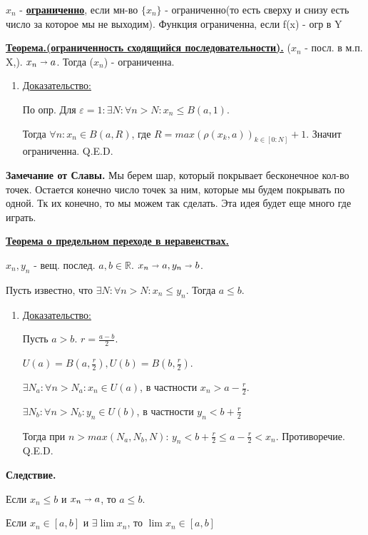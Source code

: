 \documentclass{article}
\newcommand{\deff}[1]{\underline{\textbf{#1}}}
\newcommand{\thmm}[1]{\underline{\textbf{#1}}}
\begin{document}
$x_n$ - \deff{ограниченно}, если мн-во $\{x_n\}$ - ограниченно(то есть сверху и снизу есть число за которое мы не выходим). Функция ограниченна, если f(x) - огр в Y

\thmm{Теорема.(ограниченность сходящийся последовательности).} ($x_n$ - посл. в м.п. X,). $x_n \shortrightarrow a$. Тогда ($x_n$) - ограниченна.



\begin{enumerate}
    \item[] \uline{Доказательство:}
    
    По опр. Для $\varepsilon = 1: \exists N: \forall n> N: x_n \leq B(a,1)$.

    Тогда $\forall n: x_n \in B(a,R)$, где $R=max(\rho(x_k,a))_{k \in [0:N]} +1 $. Значит ограниченна. Q.E.D.
    
\end{enumerate}

\textbf{Замечание от Славы.} Мы берем шар, который покрывает бесконечное кол-во точек. Остается конечно число точек за ним, которые мы будем покрывать по одной. Тк их конечно, то мы можем так сделать. Эта идея будет еще много где играть.

\thmm{Теорема о предельном переходе в неравенствах.}

$x_n,y_n$ - вещ. послед. $a,b \in \mathbb{R}$. $x_n \shortrightarrow a, y_n \shortrightarrow b$.

Пусть известно, что $\exists N:\forall n>N:x_n \leq y_n$. Тогда $a \leq b$.

\begin{enumerate}
    \item[] \uline{Доказательство:}

    Пусть $a>b$. $r = \frac{a-b}{2}$.

    $U(a) = B(a,\frac{r}{2}), U(b) = B(b,\frac{r}{2})$.

    $\exists N_a : \forall n> N_a: x_n \in U(a)$, в частности $x_n > a-\frac{r}{2}$.

    $\exists N_b : \forall n> N_b: y_n \in U(b)$, в частности $y_n < b +\frac{r}{2}$

    Тогда при $n > max(N_a,N_b,N)$: $y_n<b+\frac{r}{2}\leq a-\frac{r}{2} < x_n$. Противоречие. Q.E.D.
\end{enumerate}

\textbf{Следствие.}

Если $x_n \leq b$ и $x_n \shortrightarrow a$, то $a \leq b$.

Если $x_n \in [a,b]$ и $\exists \lim x_n $, то $ \lim x_n \in [a,b]$
\end{document}
